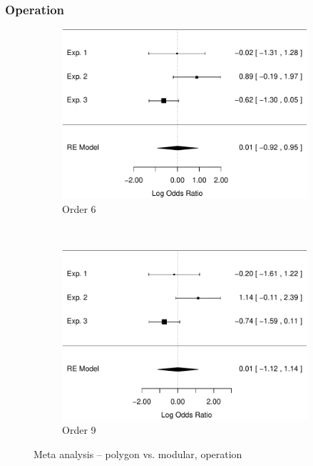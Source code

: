 \documentclass[man,10pt]{apa6}
\begin{document}
\subsubsection{Operation}
\begin{figure}[t]
\centering
\begin{subfigure}[c]{0.4\textwidth}
\centering
\includegraphics[width=\textwidth]{figures/meta/conditionpolygon.pdf}
\caption{Order 6}
\end{subfigure}
~
\begin{subfigure}[c]{0.4\textwidth}
\centering
\includegraphics[width=\textwidth]{figures/meta/question_typeoperation_9_conditionpolygon.pdf}
\caption{Order 9}
\end{subfigure}
\caption{Meta analysis -- polygon vs. modular, operation}
\label{meta_op_p}
\end{figure}\noindent 
\end{document}
